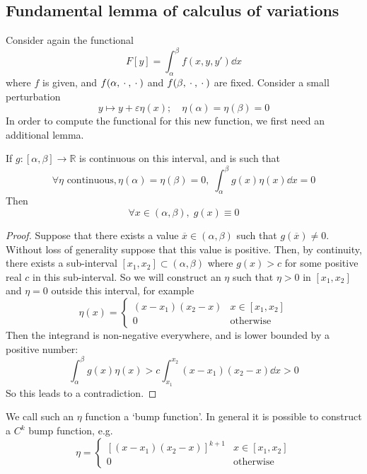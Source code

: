 \subsection{Fundamental lemma of calculus of variations}
Consider again the functional
\[
	F[y] = \int_\alpha^\beta f(x, y, y') \dd{x}
\]
where \(f\) is given, and \(f(\alpha, {}\cdot{}, {}\cdot{})\) and \(f(\beta, {}\cdot{}, {}\cdot{})\) are fixed.
Consider a small perturbation
\[
	y \mapsto y + \varepsilon \eta(x);\quad \eta(\alpha) = \eta(\beta) = 0
\]
In order to compute the functional for this new function, we first need an additional lemma.
\begin{lemma}
	If \( g \colon [\alpha, \beta] \to \mathbb R \) is continuous on this interval, and is such that
	\[
		\forall \eta \text{ continuous}, \eta(\alpha) = \eta(\beta) = 0,\; \int_\alpha^\beta g(x) \eta(x) \dd{x} = 0
	\]
	Then
	\[
		\forall x \in (\alpha, \beta),\; g(x) \equiv 0
	\]
\end{lemma}
\begin{proof}
	Suppose that there exists a value \(\overline{x} \in (\alpha, \beta)\) such that \(g(\overline{x}) \neq 0\).
	Without loss of generality suppose that this value is positive.
	Then, by continuity, there exists a sub-interval \([x_1, x_2] \subset (\alpha, \beta)\) where \(g(x) > c\) for some positive real \(c\) in this sub-interval.
	So we will construct an \(\eta\) such that \(\eta > 0\) in \([x_1, x_2]\) and \(\eta = 0\) outside this interval, for example
	\[
		\eta(x) = \begin{cases}
			(x-x_1)(x_2-x) & x \in [x_1, x_2] \\
			0              & \text{otherwise}
		\end{cases}
	\]
	Then the integrand is non-negative everywhere, and is lower bounded by a positive number:
	\[
		\int_\alpha^\beta g(x) \eta(x) > c\int_{x_1}^{x_2} (x-x_1)(x_2-x)\dd{x} > 0
	\]
	So this leads to a contradiction.
\end{proof}
\begin{remark}
	We call such an \(\eta\) function a `bump function'.
	In general it is possible to construct a \(C^k\) bump function, e.g.
	\[
		\eta = \begin{cases}
			[(x-x_1)(x_2-x)]^{k+1} & x \in [x_1, x_2] \\
			0                      & \text{otherwise}
		\end{cases}
	\]
\end{remark}

